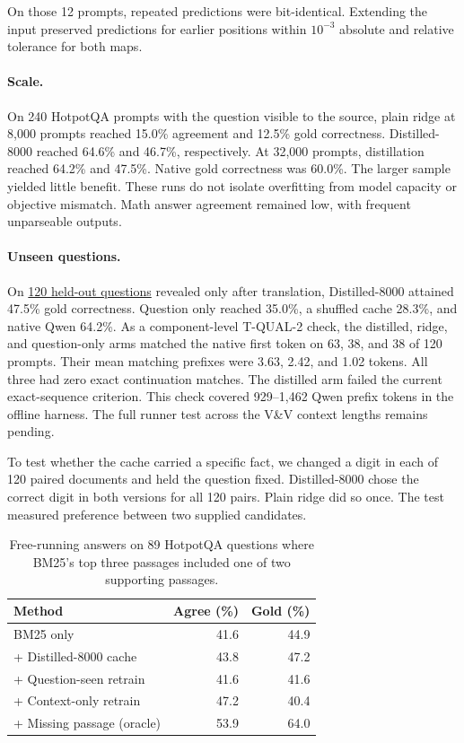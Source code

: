\documentclass[11pt]{article}
\begin{document}
On those 12 prompts, repeated predictions were bit-identical.
Extending the input preserved predictions for earlier positions
within $10^{-3}$ absolute and relative tolerance for both maps.

\paragraph{Scale.}
On 240 HotpotQA prompts with the question visible to the source,
plain ridge at 8,000 prompts reached 15.0\% agreement and 12.5\%
gold correctness. Distilled-8000 reached 64.6\% and 46.7\%,
respectively. At 32,000 prompts, distillation reached 64.2\% and
47.5\%. Native gold correctness was 60.0\%. The larger sample yielded
little benefit. These runs do not isolate overfitting from model
capacity or objective mismatch. Math answer agreement remained low,
with frequent unparseable outputs.

\paragraph{Unseen questions.}
On \href{https://huggingface.co/datasets/tandemkv/paired-kv-qwen-smollm/tree/49ce7e032245e39fedad8d54059f8520735a875d/experiments/context-diagnostic-20261113}{120 held-out questions}
revealed only after translation, Distilled-8000 attained 47.5\% gold
correctness. Question only reached 35.0\%, a shuffled cache 28.3\%,
and native Qwen 64.2\%. As a component-level T-QUAL-2 check, the
distilled, ridge, and question-only arms matched the native first token
on 63, 38, and 38 of 120 prompts. Their mean matching prefixes were
3.63, 2.42, and 1.02 tokens. All three had zero exact continuation
matches. The distilled arm failed the current exact-sequence criterion.
This check covered 929--1,462 Qwen prefix tokens in the offline harness.
The full runner test across the V\&V context lengths remains pending.

To test whether the cache carried a specific fact, we changed a digit
in each of 120 paired documents and held
the question fixed. Distilled-8000 chose the correct digit in both
versions for all 120 pairs. Plain ridge did so once. The test measured
preference between two supplied candidates.

\begin{table}[t]
  \centering
  \small
  \setlength{\tabcolsep}{4pt}
  \begin{tabular}{@{}lrr@{}}
    \toprule
    Method & Agree (\%) & Gold (\%) \\
    \midrule
    BM25 only & 41.6 & 44.9 \\
    + Distilled-8000 cache & 43.8 & 47.2 \\
    + Question-seen retrain & 41.6 & 41.6 \\
    + Context-only retrain & 47.2 & 40.4 \\
    + Missing passage (oracle) & 53.9 & 64.0 \\
    \bottomrule
  \end{tabular}
  \caption{Free-running answers on 89 HotpotQA questions where BM25's
  top three passages included one of two supporting passages.}
  \label{tab:bridge}
\end{table}
\end{document}
